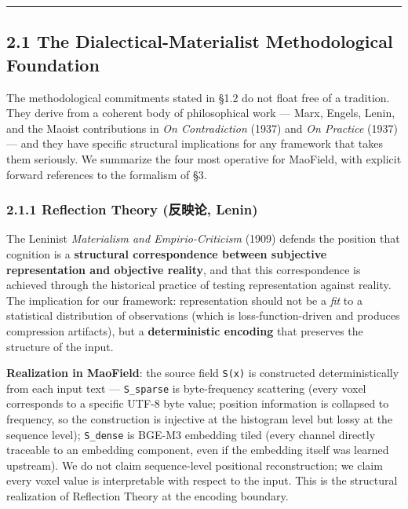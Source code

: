\documentclass[
]{article}
\begin{document}
\begin{center}\rule{0.5\linewidth}{0.5pt}\end{center}

\hypertarget{the-dialectical-materialist-methodological-foundation}{%
\subsection{2.1 The Dialectical-Materialist Methodological
Foundation}\label{the-dialectical-materialist-methodological-foundation}}

The methodological commitments stated in §1.2 do not float free of a
tradition. They derive from a coherent body of philosophical work ---
Marx, Engels, Lenin, and the Maoist contributions in \emph{On
Contradiction} (1937) and \emph{On Practice} (1937) --- and they have
specific structural implications for any framework that takes them
seriously. We summarize the four most operative for MaoField, with
explicit forward references to the formalism of §3.

\hypertarget{reflection-theory-ux53cdux6620ux8bba-lenin}{%
\subsubsection{2.1.1 Reflection Theory (反映论,
Lenin)}\label{reflection-theory-ux53cdux6620ux8bba-lenin}}

The Leninist \emph{Materialism and Empirio-Criticism} (1909) defends the
position that cognition is a \textbf{structural correspondence between
subjective representation and objective reality}, and that this
correspondence is achieved through the historical practice of testing
representation against reality. The implication for our framework:
representation should not be a \emph{fit} to a statistical distribution
of observations (which is loss-function-driven and produces compression
artifacts), but a \textbf{deterministic encoding} that preserves the
structure of the input.

\textbf{Realization in MaoField}: the source field \texttt{S(x)} is
constructed deterministically from each input text ---
\texttt{S\_sparse} is byte-frequency scattering (every voxel corresponds
to a specific UTF-8 byte value; position information is collapsed to
frequency, so the construction is injective at the histogram level but
lossy at the sequence level); \texttt{S\_dense} is BGE-M3 embedding
tiled (every channel directly traceable to an embedding component, even
if the embedding itself was learned upstream). We do not claim
sequence-level positional reconstruction; we claim every voxel value is
interpretable with respect to the input. This is the structural
realization of Reflection Theory at the encoding boundary.
\end{document}
